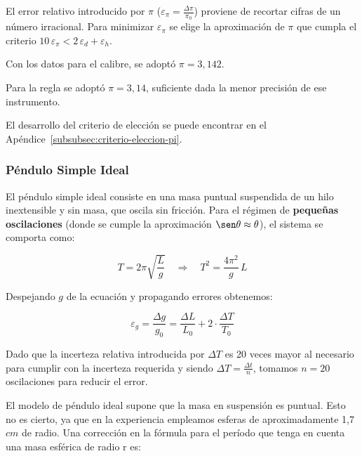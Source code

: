 El error relativo introducido por $\pi$ ($\varepsilon_\pi = \frac{\Delta \pi}{\pi_0}$) proviene de recortar cifras de un número irracional.
Para minimizar $\varepsilon_\pi$ se elige la aproximación de $\pi$ que cumpla el criterio $10\,\varepsilon_\pi < 2\,\varepsilon_d + \varepsilon_h$.

Con los datos para el calibre, se adoptó $\pi = 3{,}142$.

Para la regla se adoptó $\pi = 3{,}14$, suficiente dada la menor precisión de ese instrumento.

El desarrollo del criterio de elección se puede encontrar en el Apéndice~\ref{subsubsec:criterio-eleccion-pi}.


\subsubsection{Péndulo Simple Ideal}

El péndulo simple ideal consiste en una masa puntual suspendida de un hilo inextensible y sin masa, que oscila sin fricción.
Para el régimen de \textbf{pequeñas oscilaciones} (donde se cumple la aproximación $\sen \theta \approx \theta$), el sistema se comporta como:

\begin{equation}
    T = 2\pi \sqrt{\frac{L}{g}} \quad \Longrightarrow \quad T^2 = \frac{4\pi^2}{g}\,L
    \label{eq:periodo-pendulo-angulos-pequennos}
\end{equation}

Despejando $g$ de la ecuación y propagando errores obtenemos:

\begin{equation}
    \varepsilon_g = \frac{\Delta g}{g_0} = \frac{\Delta L}{L_0} + 2 \cdot \frac{\Delta T}{T_0}
    \label{eq:error-relativo-periodo-pendulo-angulos-pequennos}
\end{equation}

Dado que la incerteza relativa introducida por $\Delta T$ es 20 veces mayor al necesario para cumplir con la incerteza requerida y siendo $\Delta T = \frac{\Delta t}{n}$, tomamos $n = 20$ oscilaciones para reducir el error.

El modelo de péndulo ideal supone que la masa en suspensión es puntual.
Esto no es cierto, ya que en la experiencia empleamos esferas de aproximadamente 1,7 $cm$ de radio.
Una corrección en la fórmula para el período que tenga en cuenta una masa esférica de radio r es:

